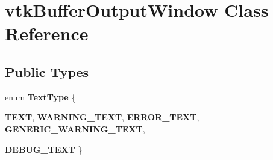 \hypertarget{classvtkBufferOutputWindow}{
\section{vtkBufferOutputWindow Class Reference}
\label{classvtkBufferOutputWindow}
}
\subsection*{Public Types}
\begin{DoxyCompactItemize}
\item 
enum {\bfseries TextType} \{ \par
{\bfseries TEXT}, 
{\bfseries WARNING\_\-TEXT}, 
{\bfseries ERROR\_\-TEXT}, 
{\bfseries GENERIC\_\-WARNING\_\-TEXT}, 
\par
{\bfseries DEBUG\_\-TEXT}
 \}
\end{DoxyCompactItemize}

